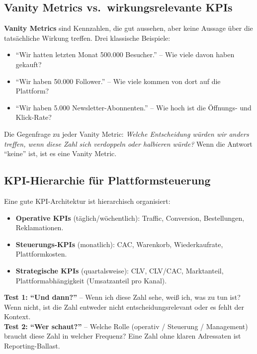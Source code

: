 \documentclass[11pt,a4paper,oneside]{article}
\newcommand{\fachbegriff}[1]{\textbf{#1}}
\begin{document}
\subsection{Vanity Metrics vs.\ wirkungsrelevante KPIs}

\fachbegriff{Vanity Metrics} sind Kennzahlen, die gut aussehen, aber keine Aussage über die tatsächliche Wirkung treffen. Drei klassische Beispiele:

\begin{itemize}
  \item ``Wir hatten letzten Monat 500.000 Besucher.'' -- Wie viele davon haben gekauft?
  \item ``Wir haben 50.000 Follower.'' -- Wie viele kommen von dort auf die Plattform?
  \item ``Wir haben 5.000 Newsletter-Abonnenten.'' -- Wie hoch ist die Öffnungs- und Klick-Rate?
\end{itemize}

Die Gegenfrage zu jeder Vanity Metric: \emph{Welche Entscheidung würden wir anders treffen, wenn diese Zahl sich verdoppeln oder halbieren würde?} Wenn die Antwort ``keine'' ist, ist es eine Vanity Metric.

\subsection{KPI-Hierarchie für Plattformsteuerung}

Eine gute KPI-Architektur ist hierarchisch organisiert:

\begin{itemize}
  \item \textbf{Operative KPIs} (täglich/wöchentlich): Traffic, Conversion, Bestellungen, Reklamationen.
  \item \textbf{Steuerungs-KPIs} (monatlich): CAC, Warenkorb, Wiederkaufrate, Plattformkosten.
  \item \textbf{Strategische KPIs} (quartalsweise): CLV, CLV/CAC, Marktanteil, Plattformabhängigkeit (Umsatzanteil pro Kanal).
\end{itemize}

\begin{merkbox}
\textbf{Test 1: ``Und dann?''} -- Wenn ich diese Zahl sehe, weiß ich, was zu tun ist? Wenn nicht, ist die Zahl entweder nicht entscheidungsrelevant oder es fehlt der Kontext. \\[4pt]
\textbf{Test 2: ``Wer schaut?''} -- Welche Rolle (operativ / Steuerung / Management) braucht diese Zahl in welcher Frequenz? Eine Zahl ohne klaren Adressaten ist Reporting-Ballast.
\end{merkbox}
\end{document}
